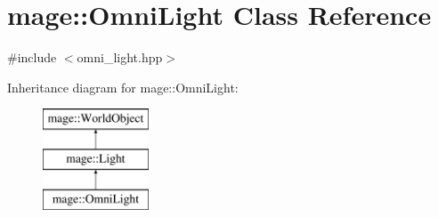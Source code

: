 \hypertarget{classmage_1_1_omni_light}{}\section{mage\+:\+:Omni\+Light Class Reference}
\label{classmage_1_1_omni_light}


{\ttfamily \#include $<$omni\+\_\+light.\+hpp$>$}

Inheritance diagram for mage\+:\+:Omni\+Light\+:\begin{figure}[H]
\begin{center}
\leavevmode
\includegraphics[height=3.000000cm]{classmage_1_1_omni_light}
\end{center}
\end{figure}
